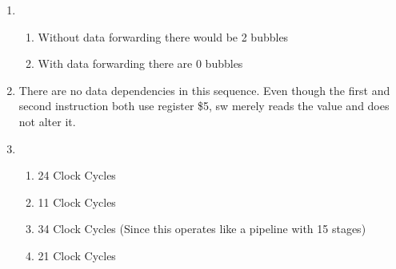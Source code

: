 \documentclass[11pt,fleqn]{article}
\begin{document}
\begin{enumerate}
\item %
	\begin{enumerate}
	\item Without data forwarding there would be 2 bubbles
	\item With data forwarding there are 0 bubbles
	
	\end{enumerate}

\item %
There are no data dependencies in this sequence. Even though the first and second instruction both use register \$5,  sw merely reads the value and does not alter it. 
\item %
\begin{enumerate}
\item 24 Clock Cycles
\item 11 Clock Cycles 
\item 34 Clock Cycles (Since this operates like a pipeline with 15 stages)
\item 21 Clock Cycles 

\end{enumerate}
\end{enumerate}
\end{document}
